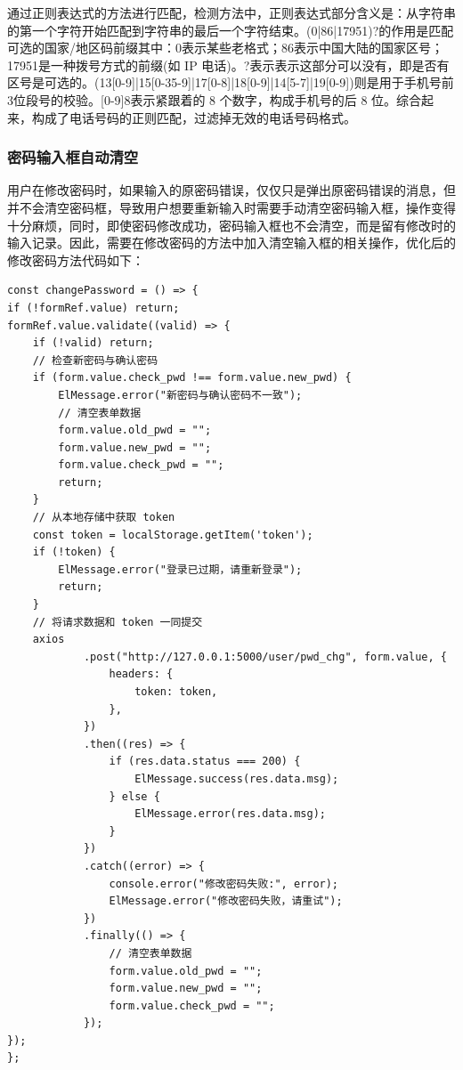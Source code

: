 \documentclass[a4paper,AutoFakeBold={2.7}]{ctexart} %
\begin{document}
通过正则表达式的方法进行匹配，检测方法中，正则表达式部分含义是：从字符串的第一个字符开始匹配到字符串的最后一个字符结束。(0|86|17951)?的作用是匹配可选的国家/地区码前缀其中：0表示某些老格式；86表示中国大陆的国家区号；17951是一种拨号方式的前缀(如 IP 电话)。?表示表示这部分可以没有，即是否有区号是可选的。(13[0-9]|15[0-35-9]|17[0-8]|18[0-9]|14[5-7]|19[0-9])则是用于手机号前3位段号的校验。[0-9]{8}表示紧跟着的 8 个数字，构成手机号的后 8 位。综合起来，构成了电话号码的正则匹配，过滤掉无效的电话号码格式。

\subsubsection{密码输入框自动清空}

用户在修改密码时，如果输入的原密码错误，仅仅只是弹出原密码错误的消息，但并不会清空密码框，导致用户想要重新输入时需要手动清空密码输入框，操作变得十分麻烦，同时，即使密码修改成功，密码输入框也不会清空，而是留有修改时的输入记录。因此，需要在修改密码的方法中加入清空输入框的相关操作，优化后的修改密码方法代码如下：

\begin{lstlisting}
const changePassword = () => {
if (!formRef.value) return;
formRef.value.validate((valid) => {
    if (!valid) return;
    // 检查新密码与确认密码
    if (form.value.check_pwd !== form.value.new_pwd) {
        ElMessage.error("新密码与确认密码不一致");
        // 清空表单数据
        form.value.old_pwd = "";
        form.value.new_pwd = "";
        form.value.check_pwd = "";
        return;
    }
    // 从本地存储中获取 token
    const token = localStorage.getItem('token');
    if (!token) {
        ElMessage.error("登录已过期，请重新登录");
        return;
    }
    // 将请求数据和 token 一同提交
    axios
            .post("http://127.0.0.1:5000/user/pwd_chg", form.value, {
                headers: {
                    token: token,
                },
            })
            .then((res) => {
                if (res.data.status === 200) {
                    ElMessage.success(res.data.msg);
                } else {
                    ElMessage.error(res.data.msg);
                }
            })
            .catch((error) => {
                console.error("修改密码失败:", error);
                ElMessage.error("修改密码失败，请重试");
            })
            .finally(() => {
                // 清空表单数据
                form.value.old_pwd = "";
                form.value.new_pwd = "";
                form.value.check_pwd = "";
            });
});
};
\end{lstlisting}
\end{document}
